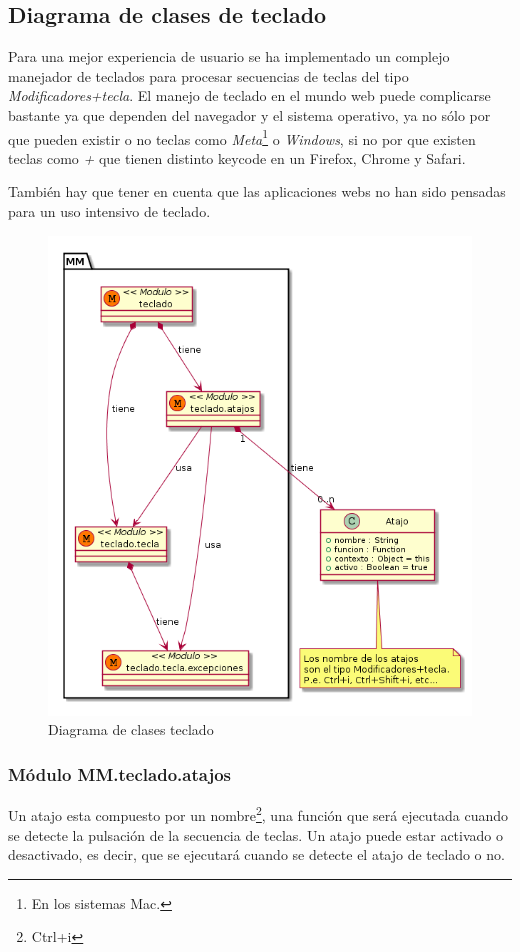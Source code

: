 \subsection{Diagrama de clases de teclado}
Para una mejor experiencia de usuario se ha implementado un complejo manejador de teclados para procesar secuencias de teclas del tipo \textit{Modificadores+tecla}. El manejo de teclado en el mundo web puede complicarse bastante ya que dependen del navegador y el sistema operativo, ya no sólo por que pueden existir o no teclas como \textit{Meta}\footnote{En los sistemas Mac.} o \textit{Windows}, si no por que existen teclas como \textit{+} que tienen distinto keycode en un Firefox, Chrome y Safari.

También hay que tener en cuenta que las aplicaciones webs no han sido pensadas para un uso intensivo de teclado.   

\begin{figure}[tbph]
\centering
\includegraphics[width=0.8\linewidth]{imagenes/diagrama-clases-mm-teclado}
\caption{Diagrama de clases teclado}
\label{fig:diagrama-clases-mm-teclado}
\end{figure}


\subsubsection{Módulo MM.teclado.atajos}
Un atajo esta compuesto por un nombre\footnote{Ctrl+i}, una función que será ejecutada cuando se
detecte la pulsación de la secuencia de teclas. Un atajo puede estar activado o desactivado, es
decir, que se ejecutará cuando se detecte el atajo de teclado o no. 

